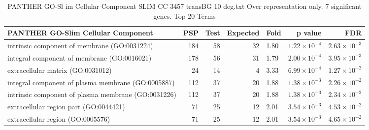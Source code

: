 \begin{table}[ht]
\centering
\begin{adjustbox}{width=\textwidth}
\begin{tabular}{lrrrlrr}
  \hline
PANTHER GO-Slim Cellular Component & PSP  & Test  & Expected & Fold & p value & FDR \\ 
  \hline
intrinsic component of membrane (GO:0031224) & 184 & 58 & 32 & 1.80 & $1.22 \times 10^{-4}$ & $2.63 \times 10^{-3}$ \\ 
  integral component of membrane (GO:0016021) & 178 & 56 & 31 & 1.79 & $2.00 \times 10^{-4}$ & $3.95 \times 10^{-3}$ \\ 
  extracellular matrix (GO:0031012) & 24 & 14 & 4 & 3.33 & $6.99 \times 10^{-4}$ & $1.27 \times 10^{-2}$ \\ 
  integral component of plasma membrane (GO:0005887) & 112 & 37 & 20 & 1.88 & $1 .38 \times 10^{-3}$ & $2.26 \times 10^{-2}$ \\ 
  intrinsic component of plasma membrane (GO:0031226) & 112 & 37 & 20 & 1.88 & $1.38 \times 10^{-3}$ & $2.34 \times 10^{-2}$ \\ 
  extracellular region part (GO:0044421) & 71 & 25 & 12 & 2.01 & $3.54 \times 10^{-3}$ & $4.53 \times 10^{-2}$ \\ 
  extracellular region (GO:0005576) & 71 & 25 & 12 & 2.01 & $3.54 \times 10^{-3}$ & $4.65 \times 10^{-2}$ \\ 
   \hline
\end{tabular}
\end{adjustbox}
\caption{PANTHER GO-Sl im Cellular Component SLIM CC 3457 transBG 10 deg.txt Over representation only. 7 significant genes. Top 20 Terms} 
\label{tab:PANTHER GO-Slim Cellular Component SLIM CC 3457 transBG 10 deg.txt Over representation only. 7 significant genes. Top 20 Terms}
\end{table}



